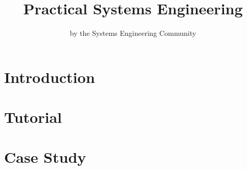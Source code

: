 \documentclass[a4paper,twoside,10pt]{book}
\title{Practical Systems Engineering}
\author{by the Systems Engineering Community}
\begin{document}
        

\maketitle

\tableofcontents

\chapter{Introduction}


\chapter{Tutorial}


\chapter{Case Study}

\end{document}
